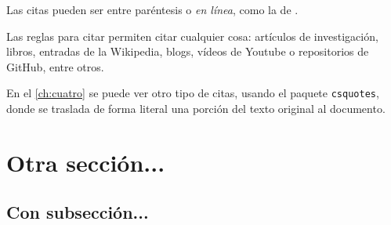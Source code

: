 Las citas pueden ser entre paréntesis \parencite{examplearticle} o \emph{en línea}, como la de \cite{examplegithub}.

Las  reglas para citar \parencite{ulllibguide} permiten citar cualquier cosa: artículos de investigación, libros, entradas de la Wikipedia, blogs, vídeos de Youtube o repositorios de GitHub, entre otros. 

En el \autoref{ch:cuatro} se puede ver otro tipo de citas, usando el paquete \texttt{csquotes}, donde se traslada de forma literal una porción del texto original al documento.
 
\section{Otra sección...}

\noindent \lipsum[1]

\subsection{Con subsección...}

\noindent \lipsum[2]